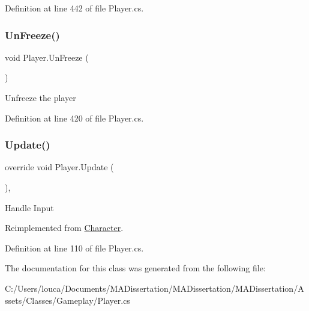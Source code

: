 Definition at line 442 of file Player.\+cs.

\mbox{\label{class_player_a7a222872698adba22fbd3c90302cc8ca}} 
\subsubsection{\texorpdfstring{Un\+Freeze()}{UnFreeze()}}
{\footnotesize\ttfamily void Player.\+Un\+Freeze (\begin{DoxyParamCaption}{ }\end{DoxyParamCaption})}



Unfreeze the player 



Definition at line 420 of file Player.\+cs.

\mbox{\label{class_player_abccf91b671f93492dfdb704ddf894ae3}} 
\subsubsection{\texorpdfstring{Update()}{Update()}}
{\footnotesize\ttfamily override void Player.\+Update (\begin{DoxyParamCaption}{ }\end{DoxyParamCaption})\hspace{0.3cm}{\ttfamily [protected]}, {\ttfamily [virtual]}}



Handle Input 



Reimplemented from \mbox{\hyperlink{class_character}{Character}}.



Definition at line 110 of file Player.\+cs.



The documentation for this class was generated from the following file\+:\begin{DoxyCompactItemize}
\item 
C\+:/\+Users/louca/\+Documents/\+M\+A\+Dissertation/\+M\+A\+Dissertation/\+M\+A\+Dissertation/\+Assets/\+Classes/\+Gameplay/Player.\+cs\end{DoxyCompactItemize}
